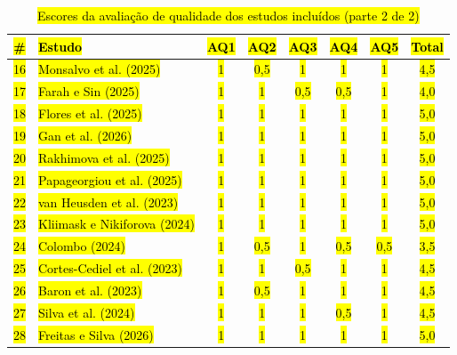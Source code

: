 \documentclass[brazilian]{sbc2025}
\newif\ifhl \hltrue
\newcommand{\rev}[1]{\ifhl\sethlcolor{yellow}\hl{#1}\else#1\fi}
\begin{document}
\begin{table}[p]
\ContinuedFloat
\centering
\caption{\rev{Escores da avaliação de qualidade dos estudos incluídos (parte 2 de 2)}}
\scriptsize
\begin{tabular}{|c|p{7.2cm}|c|c|c|c|c|c|}
\hline
\rev{\textbf{\#}} & \rev{\textbf{Estudo}} & \rev{\textbf{AQ1}} & \rev{\textbf{AQ2}} & \rev{\textbf{AQ3}} & \rev{\textbf{AQ4}} & \rev{\textbf{AQ5}} & \rev{\textbf{Total}} \\ \hline
\rev{16} & \rev{Monsalvo et al. (2025)}              & \rev{1} & \rev{0,5} & \rev{1} & \rev{1} & \rev{1} & \rev{4,5} \\ \hline
\rev{17} & \rev{Farah e Sin (2025)}                  & \rev{1} & \rev{1} & \rev{0,5} & \rev{0,5} & \rev{1} & \rev{4,0} \\ \hline
\rev{18} & \rev{Flores et al. (2025)}                & \rev{1} & \rev{1} & \rev{1} & \rev{1} & \rev{1} & \rev{5,0} \\ \hline
\rev{19} & \rev{Gan et al. (2026)}                   & \rev{1} & \rev{1} & \rev{1} & \rev{1} & \rev{1} & \rev{5,0} \\ \hline
\rev{20} & \rev{Rakhimova et al. (2025)}             & \rev{1} & \rev{1} & \rev{1} & \rev{1} & \rev{1} & \rev{5,0} \\ \hline
\rev{21} & \rev{Papageorgiou et al. (2025)}          & \rev{1} & \rev{1} & \rev{1} & \rev{1} & \rev{1} & \rev{5,0} \\ \hline
\rev{22} & \rev{van Heusden et al. (2023)}           & \rev{1} & \rev{1} & \rev{1} & \rev{1} & \rev{1} & \rev{5,0} \\ \hline
\rev{23} & \rev{Kliimask e Nikiforova (2024)}        & \rev{1} & \rev{1} & \rev{1} & \rev{1} & \rev{1} & \rev{5,0} \\ \hline
\rev{24} & \rev{Colombo (2024)}                      & \rev{1} & \rev{0,5} & \rev{1} & \rev{0,5} & \rev{0,5} & \rev{3,5} \\ \hline
\rev{25} & \rev{Cortes-Cediel et al. (2023)}         & \rev{1} & \rev{1} & \rev{0,5} & \rev{1} & \rev{1} & \rev{4,5} \\ \hline
\rev{26} & \rev{Baron et al. (2023)}                 & \rev{1} & \rev{0,5} & \rev{1} & \rev{1} & \rev{1} & \rev{4,5} \\ \hline
\rev{27} & \rev{Silva et al. (2024)}                 & \rev{1} & \rev{1} & \rev{1} & \rev{0,5} & \rev{1} & \rev{4,5} \\ \hline
\rev{28} & \rev{Freitas e Silva (2026)}              & \rev{1} & \rev{1} & \rev{1} & \rev{1} & \rev{1} & \rev{5,0} \\ \hline

\end{tabular}
\end{table}
\end{document}
